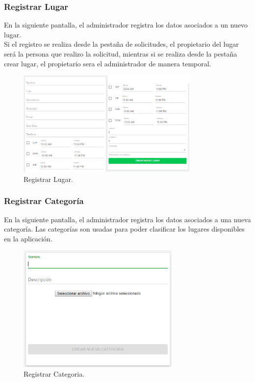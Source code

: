 \documentclass[12pt,letterpaper,openany]{book}
\begin{document}
\subsubsection{Registrar Lugar}
En la siguiente pantalla, el administrador registra los datos asociados a un nuevo lugar. \\
Si el registro se realiza desde la pestaña de solicitudes, el propietario del lugar será la persona que realizo la solicitud, mientras si se realiza desde la pestaña crear lugar, el propietario sera el administrador de manera temporal.

\begin{figure}[H]
\begin{center}
\includegraphics[width=9cm]{./imagenes/admin/crear_lugar}
\caption{Registrar Lugar.}
\end{center}
\end{figure}

\subsubsection{Registrar Categoría}
En la siguiente pantalla, el administrador registra los datos asociados a una nueva categoría.
Las categorías son usadas para poder clasificar los lugares disponibles en la aplicación.
\begin{figure}[H]
\begin{center}
\includegraphics[width=8cm]{./imagenes/admin/r_categoria}
\caption{Registrar Categoria.}
\end{center}
\end{figure}
\end{document}
